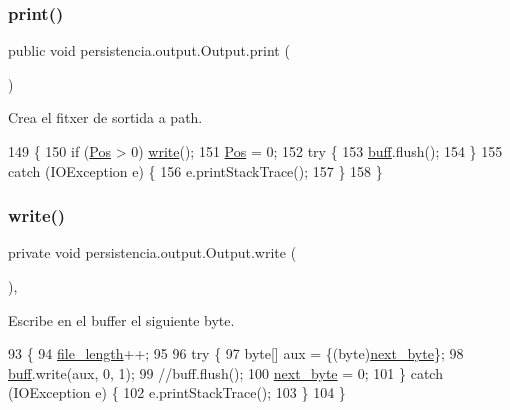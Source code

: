 \subsubsection{\texorpdfstring{print()}{print()}}
{\footnotesize\ttfamily public void persistencia.\+output.\+Output.\+print (\begin{DoxyParamCaption}{ }\end{DoxyParamCaption})\hspace{0.3cm}{\ttfamily [inline]}}



Crea el fitxer de sortida a path. 


\begin{DoxyCode}
149     \{
150         \textcolor{keywordflow}{if} (\hyperlink{classpersistencia_1_1output_1_1Output_a3709182600423f7e57644ccdd0016f22}{Pos} > 0) \hyperlink{classpersistencia_1_1output_1_1Output_a57be8c4ed429f03caa5c2bcc97e2260d}{write}();
151         \hyperlink{classpersistencia_1_1output_1_1Output_a3709182600423f7e57644ccdd0016f22}{Pos} = 0;
152         \textcolor{keywordflow}{try} \{
153             \hyperlink{classpersistencia_1_1output_1_1Output_ae8f22fd92b020c318f6f377cf3ac39de}{buff}.flush();
154         \}
155         \textcolor{keywordflow}{catch} (IOException e) \{
156             e.printStackTrace();
157         \}
158     \}
\end{DoxyCode}
\mbox{\label{classpersistencia_1_1output_1_1Output_a57be8c4ed429f03caa5c2bcc97e2260d}} 
\subsubsection{\texorpdfstring{write()}{write()}}
{\footnotesize\ttfamily private void persistencia.\+output.\+Output.\+write (\begin{DoxyParamCaption}{ }\end{DoxyParamCaption})\hspace{0.3cm}{\ttfamily [inline]}, {\ttfamily [private]}}



Escribe en el buffer el siguiente byte. 


\begin{DoxyCode}
93                          \{
94         \hyperlink{classpersistencia_1_1output_1_1Output_a028761929614fdc2b88f9ebe0e2313ef}{file\_length}++;
95 
96         \textcolor{keywordflow}{try} \{
97             byte[] aux = \{(byte)\hyperlink{classpersistencia_1_1output_1_1Output_aca83082ef84ec2e169b6fa34618d0773}{next\_byte}\};
98             \hyperlink{classpersistencia_1_1output_1_1Output_ae8f22fd92b020c318f6f377cf3ac39de}{buff}.write(aux, 0, 1);
99             \textcolor{comment}{//buff.flush();}
100             \hyperlink{classpersistencia_1_1output_1_1Output_aca83082ef84ec2e169b6fa34618d0773}{next\_byte} = 0;
101         \} \textcolor{keywordflow}{catch} (IOException e) \{
102             e.printStackTrace();
103         \}
104     \}
\end{DoxyCode}


